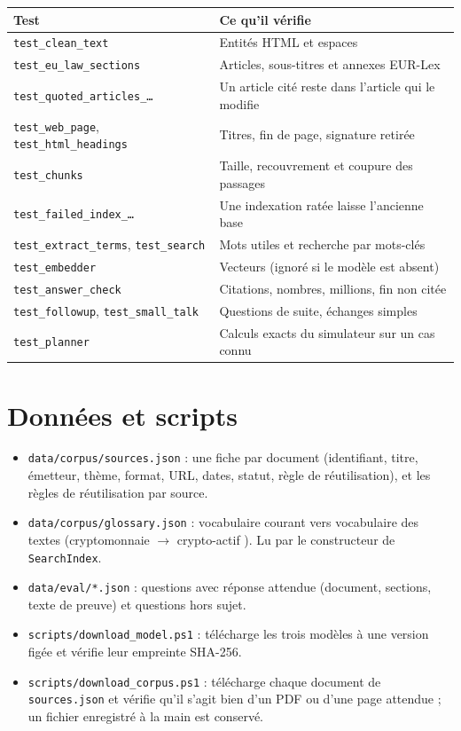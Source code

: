 \documentclass[11pt,a4paper]{article}
\newcommand{\fichier}[1]{\texttt{#1}}
\begin{document}
{{{\begin{center}
\small
\begin{tabularx}{\linewidth}{@{}l X@{}}
\toprule
Test & Ce qu'il vérifie \\
\midrule
\texttt{test\_clean\_text} & Entités HTML et espaces \\
\texttt{test\_eu\_law\_sections} & Articles, sous-titres et annexes EUR-Lex \\
\texttt{test\_quoted\_articles\_\dots} & Un article cité reste dans l'article qui le modifie \\
\texttt{test\_web\_page}, \texttt{test\_html\_headings} & Titres, fin de page, signature retirée \\
\texttt{test\_chunks} & Taille, recouvrement et coupure des passages \\
\texttt{test\_failed\_index\_\dots} & Une indexation ratée laisse l'ancienne base \\
\texttt{test\_extract\_terms}, \texttt{test\_search} & Mots utiles et recherche par mots-clés \\
\texttt{test\_embedder} & Vecteurs (ignoré si le modèle est absent) \\
\texttt{test\_answer\_check} & Citations, nombres, millions, fin non citée \\
\texttt{test\_followup}, \texttt{test\_small\_talk} & Questions de suite, échanges simples \\
\texttt{test\_planner} & Calculs exacts du simulateur sur un cas connu \\
\bottomrule
\end{tabularx}
\end{center}

\section{Données et scripts}

\begin{itemize}
  \item \fichier{data/corpus/sources.json} : une fiche par document (identifiant, titre, émetteur, thème, format, URL, dates, statut, règle de réutilisation), et les règles de réutilisation par source.
  \item \fichier{data/corpus/glossary.json} : vocabulaire courant vers vocabulaire des textes (\og cryptomonnaie \fg{} \(\rightarrow\) \og crypto-actif \fg). Lu par le constructeur de \texttt{SearchIndex}.
  \item \fichier{data/eval/*.json} : questions avec réponse attendue (document, sections, texte de preuve) et questions hors sujet.
  \item \fichier{scripts/download\_model.ps1} : télécharge les trois modèles à une version figée et vérifie leur empreinte SHA-256.
  \item \fichier{scripts/download\_corpus.ps1} : télécharge chaque document de \fichier{sources.json} et vérifie qu'il s'agit bien d'un PDF ou d'une page attendue ; un fichier enregistré à la main est conservé.
\end{itemize}

}}}
\end{document}
